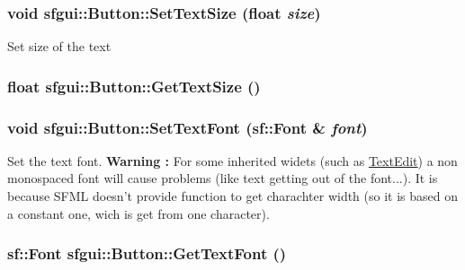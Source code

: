 \hypertarget{classsfgui_1_1Button_eed26d1a50f825f24ef1f2a16ef0b425}{
\subsubsection[SetTextSize]{\setlength{\rightskip}{0pt plus 5cm}void sfgui::Button::SetTextSize (float {\em size})}}
\label{classsfgui_1_1Button_eed26d1a50f825f24ef1f2a16ef0b425}




Set size of the text \hypertarget{classsfgui_1_1Button_ed3a5fc8690d92ee59483b5dd7de6dbf}{
\subsubsection[GetTextSize]{\setlength{\rightskip}{0pt plus 5cm}float sfgui::Button::GetTextSize ()}}
\label{classsfgui_1_1Button_ed3a5fc8690d92ee59483b5dd7de6dbf}


\hypertarget{classsfgui_1_1Button_f1a92c908326f7bd9973da154854a8bd}{
\subsubsection[SetTextFont]{\setlength{\rightskip}{0pt plus 5cm}void sfgui::Button::SetTextFont (sf::Font \& {\em font})}}
\label{classsfgui_1_1Button_f1a92c908326f7bd9973da154854a8bd}




Set the text font. {\bf Warning : } For some inherited widets (such as \hyperlink{classsfgui_1_1TextEdit}{TextEdit}) a non monospaced font will cause problems (like text getting out of the font...). It is because SFML doesn't provide function to get charachter width (so it is based on a constant one, wich is get from one character). \hypertarget{classsfgui_1_1Button_8b3a0a7ac0482c039e11bb615a55e86b}{
\subsubsection[GetTextFont]{\setlength{\rightskip}{0pt plus 5cm}sf::Font sfgui::Button::GetTextFont ()}}
\label{classsfgui_1_1Button_8b3a0a7ac0482c039e11bb615a55e86b}


